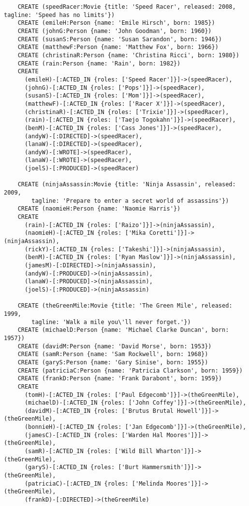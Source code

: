 \begin{lstlisting}
	CREATE (speedRacer:Movie {title: 'Speed Racer', released: 2008, tagline: 'Speed has no limits'})
	CREATE (emileH:Person {name: 'Emile Hirsch', born: 1985})
	CREATE (johnG:Person {name: 'John Goodman', born: 1960})
	CREATE (susanS:Person {name: 'Susan Sarandon', born: 1946})
	CREATE (matthewF:Person {name: 'Matthew Fox', born: 1966})
	CREATE (christinaR:Person {name: 'Christina Ricci', born: 1980})
	CREATE (rain:Person {name: 'Rain', born: 1982})
	CREATE
	  (emileH)-[:ACTED_IN {roles: ['Speed Racer']}]->(speedRacer),
	  (johnG)-[:ACTED_IN {roles: ['Pops']}]->(speedRacer),
	  (susanS)-[:ACTED_IN {roles: ['Mom']}]->(speedRacer),
	  (matthewF)-[:ACTED_IN {roles: ['Racer X']}]->(speedRacer),
	  (christinaR)-[:ACTED_IN {roles: ['Trixie']}]->(speedRacer),
	  (rain)-[:ACTED_IN {roles: ['Taejo Togokahn']}]->(speedRacer),
	  (benM)-[:ACTED_IN {roles: ['Cass Jones']}]->(speedRacer),
	  (andyW)-[:DIRECTED]->(speedRacer),
	  (lanaW)-[:DIRECTED]->(speedRacer),
	  (andyW)-[:WROTE]->(speedRacer),
	  (lanaW)-[:WROTE]->(speedRacer),
	  (joelS)-[:PRODUCED]->(speedRacer)
	
	CREATE (ninjaAssassin:Movie {title: 'Ninja Assassin', released: 2009,
	    tagline: 'Prepare to enter a secret world of assassins'})
	CREATE (naomieH:Person {name: 'Naomie Harris'})
	CREATE
	  (rain)-[:ACTED_IN {roles: ['Raizo']}]->(ninjaAssassin),
	  (naomieH)-[:ACTED_IN {roles: ['Mika Coretti']}]->(ninjaAssassin),
	  (rickY)-[:ACTED_IN {roles: ['Takeshi']}]->(ninjaAssassin),
	  (benM)-[:ACTED_IN {roles: ['Ryan Maslow']}]->(ninjaAssassin),
	  (jamesM)-[:DIRECTED]->(ninjaAssassin),
	  (andyW)-[:PRODUCED]->(ninjaAssassin),
	  (lanaW)-[:PRODUCED]->(ninjaAssassin),
	  (joelS)-[:PRODUCED]->(ninjaAssassin)
	
	CREATE (theGreenMile:Movie {title: 'The Green Mile', released: 1999,
	    tagline: 'Walk a mile you\'ll never forget.'})
	CREATE (michaelD:Person {name: 'Michael Clarke Duncan', born: 1957})
	CREATE (davidM:Person {name: 'David Morse', born: 1953})
	CREATE (samR:Person {name: 'Sam Rockwell', born: 1968})
	CREATE (garyS:Person {name: 'Gary Sinise', born: 1955})
	CREATE (patriciaC:Person {name: 'Patricia Clarkson', born: 1959})
	CREATE (frankD:Person {name: 'Frank Darabont', born: 1959})
	CREATE
	  (tomH)-[:ACTED_IN {roles: ['Paul Edgecomb']}]->(theGreenMile),
	  (michaelD)-[:ACTED_IN {roles: ['John Coffey']}]->(theGreenMile),
	  (davidM)-[:ACTED_IN {roles: ['Brutus Brutal Howell']}]->(theGreenMile),
	  (bonnieH)-[:ACTED_IN {roles: ['Jan Edgecomb']}]->(theGreenMile),
	  (jamesC)-[:ACTED_IN {roles: ['Warden Hal Moores']}]->(theGreenMile),
	  (samR)-[:ACTED_IN {roles: ['Wild Bill Wharton']}]->(theGreenMile),
	  (garyS)-[:ACTED_IN {roles: ['Burt Hammersmith']}]->(theGreenMile),
	  (patriciaC)-[:ACTED_IN {roles: ['Melinda Moores']}]->(theGreenMile),
	  (frankD)-[:DIRECTED]->(theGreenMile)
	

\end{lstlisting}
